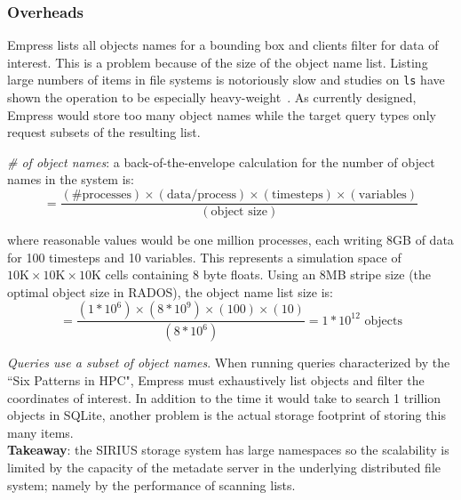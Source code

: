 \subsubsection{Overheads}

Empress lists all objects names for a bounding box and clients filter for data
of interest. This is a problem because of the size of the object name list.
Listing large numbers of items in file systems is notoriously slow and studies
on \texttt{ls} have shown the operation to be especially
heavy-weight~\cite{carns:ipdps09-pvfs, eshel:fast10-panache}.  As currently
designed, Empress would store too many object names while the target query
types only request subsets of the resulting list.

\emph{\# of object names}: a back-of-the-envelope calculation for the number of
object names in the system is:
\[=\frac
  {(\text{\# processes})\times
   (\text{data/process})\times
   (\text{timesteps})\times
   (\text{variables})}
  {(\text{object size})}
\]

where reasonable values would be one million processes, each writing 8GB of
data for 100 timesteps and 10 variables. This represents a simulation space of
\(10\text{K}\times10\text{K}\times10\text{K}\) cells containing 8 byte floats.
Using an 8MB stripe size (the optimal object size in RADOS), the object name
list size is: \[=\frac{(1*10^6)\times(8*10^{9})\times(100)\times(10)}{(8*10^6)}
= 1*10^{12} \text{ objects} \]

\emph{Queries use a subset of object names}. When running queries characterized
by the ``Six Patterns in HPC", Empress must exhaustively list objects and
filter the coordinates of interest.  In addition to the time it would take to
search 1 trillion objects in SQLite, another problem is the actual storage
footprint of storing this many items.\\

 \noindent\textbf{Takeaway}: the SIRIUS storage system has large namespaces so
the scalability is limited by the capacity of the metadate server in the
underlying distributed file system; namely by the performance of scanning
lists.
